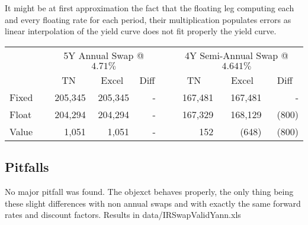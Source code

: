 It might be at first approximation the fact that the floating leg computing each and every floating rate for each period, their multiplication populates errors as linear interpolation of the yield curve does not fit properly the yield curve.


\begin{center}
\begin{tabular}{|l|l|l|l|l|l|l|l|l|}
\cline{3-5}\cline{7-9}
\multicolumn{1}{c}{} & \multicolumn{1}{c|}{} & \multicolumn{3}{c|}{5Y Annual Swap @ $4.71\%$} & \multicolumn{1}{c|}{} & \multicolumn{3}{c|}{4Y Semi-Annual Swap @ $4.641\%$} \\ 
\cline{3-5}\cline{7-9}
\multicolumn{1}{c}{} & \multicolumn{1}{c|}{} & \multicolumn{1}{c|}{TN} & \multicolumn{1}{c|}{Excel} & \multicolumn{1}{c|}{Diff} & \multicolumn{1}{c|}{} & \multicolumn{1}{c|}{TN} & \multicolumn{1}{c|}{Excel} & \multicolumn{1}{c|}{Diff} \\ 
\cline{1-1}\cline{3-5}\cline{7-9}
Fixed & \multicolumn{1}{r|}{} & \multicolumn{1}{r|}{ 205,345 } & \multicolumn{1}{r|}{ 205,345 } & \multicolumn{1}{r|}{ -   } & \multicolumn{1}{r|}{} & \multicolumn{1}{r|}{ 167,481 } & \multicolumn{1}{r|}{ 167,481 } & \multicolumn{1}{r|}{ -   } \\ 
\cline{1-1}\cline{3-5}\cline{7-9}
Float & \multicolumn{1}{r|}{} & \multicolumn{1}{r|}{ 204,294 } & \multicolumn{1}{r|}{ 204,294 } & \multicolumn{1}{r|}{ -   } & \multicolumn{1}{r|}{} & \multicolumn{1}{r|}{ 167,329 } & \multicolumn{1}{r|}{ 168,129 } & \multicolumn{1}{r|}{ (800)} \\ 
\cline{1-1}\cline{3-5}\cline{7-9}
Value & \multicolumn{1}{r|}{} & \multicolumn{1}{r|}{ 1,051 } & \multicolumn{1}{r|}{ 1,051 } & \multicolumn{1}{r|}{ -   } & \multicolumn{1}{r|}{} & \multicolumn{1}{r|}{ 152 } & \multicolumn{1}{r|}{ (648)} & \multicolumn{1}{r|}{ (800)} \\ 
\cline{1-1}\cline{3-5}\cline{7-9}
\end{tabular}\end{center}


\subsection{Pitfalls}

No major pitfall was found. The objexct behaves properly, the only thing being these slight differences with non annual swaps and with exactly the same forward rates and discount factors. Results in data/IRSwapValidYann.xls
